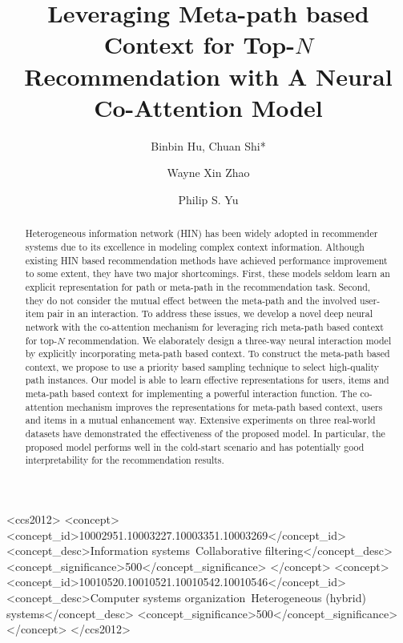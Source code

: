 \documentclass[sigconf]{acmart}
\author{Binbin Hu, Chuan Shi*}
\affiliation{%
  \institution{Beijing University of Posts and Telecommunications, Beijing, China}
}
\author{Wayne Xin Zhao}
\affiliation{%
  \institution{School of Information, Renmin University of China, Beijing, China}
}
\author{Philip S. Yu}
\affiliation{%
  \institution{University of Illinois at Chicago}
  \city{IL}
  \country{USA}
}
\begin{document}
\title{Leveraging Meta-path based Context for Top-$N$ Recommendation with A Neural Co-Attention Model}

\begin{abstract}
Heterogeneous information network (HIN) has  been widely adopted in recommender systems due to its excellence in modeling complex context information.  
Although existing HIN based recommendation methods have achieved performance improvement to some extent, they have two major shortcomings. First, these models seldom learn an explicit representation for path or meta-path in the recommendation task. Second, they do not consider the mutual effect between the meta-path and the involved user-item pair in an interaction. 
To address these issues, we develop a novel deep neural network with the co-attention mechanism for leveraging rich meta-path based context for top-$N$ recommendation. 
We elaborately design a three-way neural interaction model by explicitly incorporating meta-path based context.
 To construct the meta-path based context, we propose to use a priority based sampling technique to select high-quality path instances.
 Our model is able to learn effective representations for users, items and meta-path based context for implementing a powerful interaction function.
The co-attention mechanism  improves the representations for  meta-path based context, users and items in a mutual enhancement way. 
Extensive experiments on three real-world datasets have demonstrated the effectiveness of the proposed model.
In particular, the proposed model performs well in the cold-start scenario and has potentially good interpretability for the recommendation results.
\end{abstract}

\begin{CCSXML}
<ccs2012>
<concept>
<concept_id>10002951.10003227.10003351.10003269</concept_id>
<concept_desc>Information systems~Collaborative filtering</concept_desc>
<concept_significance>500</concept_significance>
</concept>
<concept>
<concept_id>10010520.10010521.10010542.10010546</concept_id>
<concept_desc>Computer systems organization~Heterogeneous (hybrid) systems</concept_desc>
<concept_significance>500</concept_significance>
</concept>
</ccs2012>
\end{CCSXML}


\end{document}
